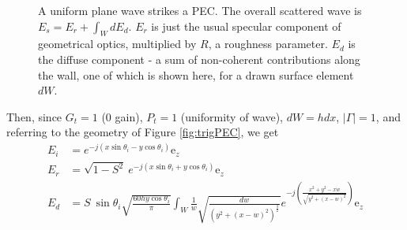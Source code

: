 \documentclass[lettersize,journal]{IEEEtran}
\begin{document}
\begin{figure}[H]
\begin{center}
            \caption{A uniform plane wave strikes a PEC. The overall scattered wave is
            $E_s = E_r + \int_W d E_d$. $E_r$ is just the usual specular component of
            geometrical optics, multiplied by $R$, a roughness parameter. $E_d$ is the
            diffuse component - a sum of non-coherent contributions along the wall, one
            of which is shown here, for a drawn surface element $dW$.}
            \label{fig:planeWavePEC}
            \end{center}
            \end{figure}
            Then, since $G_t = 1$ (0 gain), $P_t = 1$ (uniformity of wave), $dW = h dx$,
            $\left| \Gamma \right| = 1$, and referring to the geometry of Figure
            \ref{fig:trigPEC}, we get
            \small
            \begin{subequations}
                \begin{align}
                    E_i &= e^{-j(x \sin \theta_i - y \cos \theta_i)} \text{e}_z \\
                    E_r &= \sqrt{1 - S^{2}} \ e^{-j(x \sin \theta_i + y \cos \theta_i)}
                        \text{e}_z \\
                    E_d &= S \ \sin \theta_i \sqrt{\frac{60hy \cos \theta_i}{\pi}} \int_W
                    \frac{1}{w} \sqrt{\frac{ dw }{\left( y^{2} + (x - w)^{2} \right)^{\frac{3}{2}} }}
                    e^{-j\left(\frac{x^{2} + y^{2} -xw}{\sqrt{y^{2} +(x-w)^{2}} }\right)} \text{e}_z
                \end{align}
            \end{subequations}
\end{document}
